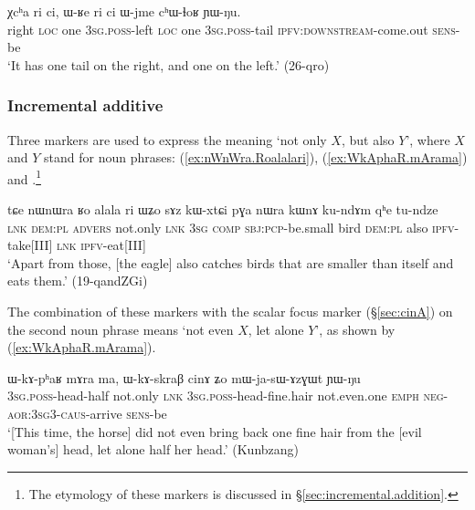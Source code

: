  \begin{exe}
\ex \label{ex:Xcha.ri.ci}
\gll   χcʰa ri ci, ɯ-ʁe ri ci ɯ-jme cʰɯ-ɬoʁ ɲɯ-ŋu. \\
right \textsc{loc} one  \textsc{3sg}.\textsc{poss}-left \textsc{loc} one \textsc{3sg}.\textsc{poss}-tail \textsc{ipfv}:\textsc{downstream}-come.out \textsc{sens}-be \\
\glt `It has one tail on the right, and one on the left.' (26-qro)
\end{exe}

 
    
 \subsubsection{Incremental additive} \label{sec:incremental.add.np} 
Three markers are used to express the meaning `not only $X$, but also $Y$', where $X$ and $Y$ stand for noun phrases:  (\ref{ex:nWnWra.Roalalari}),  (\ref{ex:WkAphaR.mArama}) and .\footnote{The etymology of these markers is discussed in §\ref{sec:incremental.addition}. } 

 \begin{exe}
\ex \label{ex:nWnWra.Roalalari}
 \gll tɕe nɯnɯra ʁo alala ri ɯʑo sɤz kɯ-xtɕi pɣa nɯra kɯnɤ ku-ndɤm qʰe tu-ndze \\
 \textsc{lnk} \textsc{dem}:\textsc{pl} \textsc{advers} not.only \textsc{lnk} \textsc{3sg} \textsc{comp} \textsc{sbj}:\textsc{pcp}-be.small bird \textsc{dem}:\textsc{pl} also \textsc{ipfv}-take[III] \textsc{lnk} \textsc{ipfv}-eat[III] \\
 \glt `Apart from those, [the eagle] also catches birds that are smaller than itself and eats them.' (19-qandZGi)
  \end{exe}

The combination of these markers with the scalar focus marker  (§\ref{sec:cinA}) on the second noun phrase means `not even $X$, let alone $Y$', as shown by (\ref{ex:WkAphaR.mArama}).


 \begin{exe}
\ex \label{ex:WkAphaR.mArama}
 \gll ɯ-kɤ-pʰaʁ mɤra ma, ɯ-kɤ-skraβ cinɤ ʑo mɯ-ja-sɯ-ɤzɣɯt ɲɯ-ŋu \\
 \textsc{3sg}.\textsc{poss}-head-half not.only \textsc{lnk} \textsc{3sg}.\textsc{poss}-head-fine.hair not.even.one \textsc{emph} \textsc{neg}-\textsc{aor}:\textsc{3sg}\fl{}3-\textsc{caus}-arrive \textsc{sens}-be \\
 \glt `[This time, the horse] did not even bring back one fine hair from the [evil woman's] head, let alone half her head.' (Kunbzang)
  \end{exe} 
  
